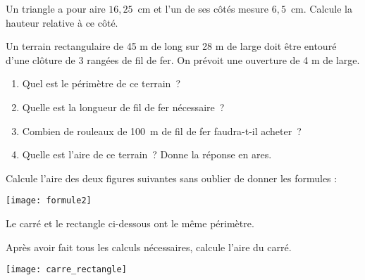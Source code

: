 \begin{exercice}
Un triangle a pour aire $16,25$ cm et l'un de ses côtés mesure $6,5$ cm. Calcule la hauteur relative à ce côté.
\end{exercice}



\begin{exercice}
Un terrain rectangulaire de 45 m de long sur 28 m de large doit être entouré d’une clôture de 3 rangées de fil de fer. On prévoit une ouverture de 4 m de large.
\begin{enumerate}
 \item Quel est le périmètre de ce terrain ?
 \item Quelle est la longueur de fil de fer nécessaire ?
 \item Combien de rouleaux de 100 m de fil de fer faudra-t-il acheter ?
 \item Quelle est l’aire de ce terrain ? Donne la réponse en ares.
 \end{enumerate}
\end{exercice}




\begin{exercice}
Calcule l'aire des deux figures suivantes sans oublier de donner les formules :
\begin{center}  \end{center} 
\begin{center} \texttt{[image: formule2]} \end{center} 
\end{exercice}


\begin{exercice}
Le carré et le rectangle ci-dessous ont le même périmètre.
     
Après avoir fait tous les calculs nécessaires, calcule l’aire du carré.
\begin{center} \texttt{[image: carre\_rectangle]} \end{center} 
\end{exercice}



